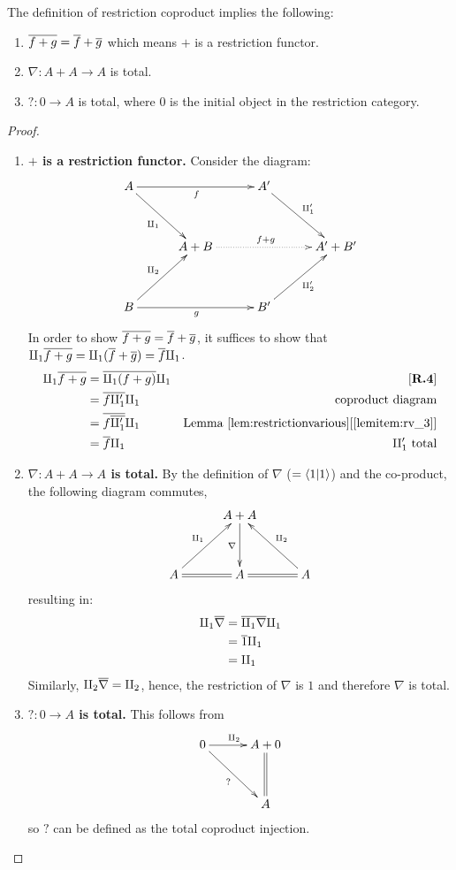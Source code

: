 \begin{lemma}\label{lem:restriction_coproduct_is_restriction_functor}
  The definition of restriction coproduct implies the following:
  \begin{enumerate}[{(}i{)}]
    \item $\overline{f+g} = \overline{f} + \overline{g}$ which means $+$ is a restriction functor.
    \item $\nabla:A+A\to A$ is total.
    \item $?:0 \to A$ is total, where $0$ is the initial object in the restriction category.
  \end{enumerate}
\end{lemma}
\begin{proof}
  \prepprooflist
  \begin{enumerate}[{(}i{)}]
    \item \textbf{$+$ is a restriction functor.}
      Consider the diagram:
      \[
        \xymatrix @C=30pt @R=35pt{
          A \ar[rr]_{f} \ar[dr]_{\cpa} && A' \ar[dr]^{\cpa'}\\
          &A+B \ar@{.>}[rr]^{f+g} & & A' + B'\\
          B \ar[rr]_{g} \ar[ur]^{\cpb} && B' \ar[ur]_{\cpb'}
        }
      \]
      In order to show $\overline{f+g} = \overline{f} + \overline{g}$, it suffices to show that
      $\amalg_{1}\overline{f+g} = \amalg_{1}(\overline{f} + \overline{g}) = \overline{f}\amalg_{1}$.
      \begin{align*}
        \cpa\restr{f+g} &= \restr{\cpa(f+g)}\cpa & \rfour\\
        &= \restr{f \cpa'} \cpa &\text{coproduct diagram}\\
        &= \restr{f \restr{\cpa'}} \cpa
          & \text{Lemma }\refitem{lem:restrictionvarious}{lemitem:rv_3}\\
        &= \restr{f} \cpa & \cpa'\text{ total}
      \end{align*}
    \item   \textbf{$\nabla:A+A\to A$ is total.}
      By the definition of $\nabla$ ($=\langle1 | 1 \rangle$) and the co-product, the following diagram
      commutes,
      \[
        \xymatrix @C=30pt @R=35pt{
          &A + A \ar[d]_{\nabla}\\
          A \ar@{=}[r] \ar[ur]^{\cpa}&A \ar@{=}[r] & A \ar[ul]_{\cpb}
        }
      \]
      resulting in:
      \begin{align*}
        \amalg_{1} \overline{\nabla} & = \overline{\amalg_{1} \nabla} \amalg_{1}\\
        &= \overline{1} \amalg_{1}\\
        &= \amalg_{1}
      \end{align*}
      Similarly, $\amalg_{2} \overline{\nabla} = \amalg_{2}$, hence, the restriction of $\nabla$ is $1$ and
      therefore $\nabla$ is total.
    \item  \textbf{$?:0 \to A$ is total.}
      This follows from
      \[
        \xymatrix @C=30pt @R=35pt{
          0 \ar[dr]_{?} \ar[r]^{\cpb} &A + 0 \\
          & A \ar@{=}[u]
        }
      \]
      so $?$ can be defined as the total coproduct injection.
  \end{enumerate}



\end{proof}

